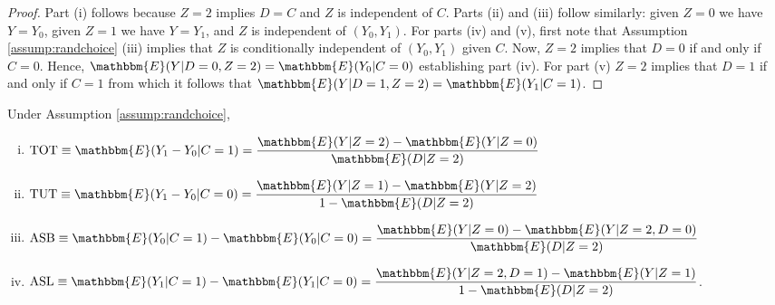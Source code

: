 \documentclass[12pt, a4paper, colorinlistoftodos]{article}
\begin{document}
\begin{proof}
Part (i) follows because $Z=2$ implies $D=C$ and $Z$ is independent of $C$.  
Parts (ii) and (iii) follow similarly: given $Z=0$ we have $Y = Y_0$, given $Z=1$ we have $Y = Y_1$, and $Z$ is independent of $(Y_0,Y_1)$.
For parts (iv) and (v), first note that Assumption \ref{assump:randchoice} (iii) implies that $Z$ is conditionally independent of $(Y_0,Y_1)$ given $C$.
Now, $Z=2$ implies that $D=0$ if and only if $C=0$. Hence, $\mathbbm{E}(Y|D=0, Z=2) = \mathbbm{E}(Y_0|C=0)$ establishing part (iv).
For part (v) $Z=2$ implies that $D=1$ if and only if $C=1$ from which it follows that $\mathbbm{E}(Y|D=1, Z=2) = \mathbbm{E}(Y_1|C=1)$.
\end{proof}

\begin{prop} 
Under Assumption \ref{assump:randchoice},
    \begin{enumerate}[(i)]
        \item $\text{TOT} \equiv \mathbbm{E}(Y_1 - Y_0|C=1)  = \displaystyle \frac{\mathbbm{E}(Y|Z=2) - \mathbbm{E}(Y|Z=0)}{\mathbbm{E}(D|Z=2)}$
        \item $\text{TUT} \equiv \mathbbm{E}(Y_1 - Y_0|C=0) = \displaystyle \frac{\mathbbm{E}(Y|Z=1) - \mathbbm{E}(Y|Z=2)}{1 - \mathbbm{E}(D|Z=2)}$
        \item $\text{ASB} \equiv \mathbbm{E}(Y_0|C=1) - \mathbbm{E}(Y_0|C=0) = \displaystyle \frac{\mathbbm{E}(Y|Z=0) - \mathbbm{E}(Y|Z=2,D=0)}{\mathbbm{E}(D|Z=2)}$
        \item $\text{ASL} \equiv \mathbbm{E}(Y_1|C=1) - \mathbbm{E}(Y_1|C=0) = \displaystyle \frac{\mathbbm{E}(Y|Z=2,D=1) - \mathbbm{E}(Y|Z=1)}{1 - \mathbbm{E}(D|Z=2)}$.
    \end{enumerate}
\end{prop}
\end{document}
